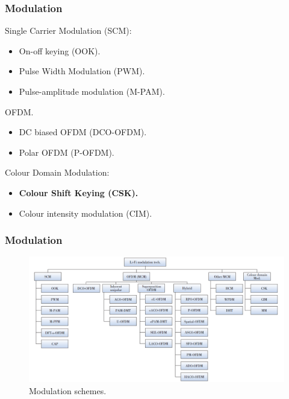 \documentclass[mathserif]{beamer}
\newcommand{\wait}{\vfill}
\begin{document}
\begin{frame}
\frametitle{Modulation}
Single Carrier Modulation (SCM):
\begin{itemize}
	\item On-off keying (OOK).
	\item Pulse Width Modulation (PWM).
	\item Pulse-amplitude modulation (M-PAM). \wait
\end{itemize}

OFDM.
\begin{itemize}
	\item DC biased OFDM (DCO-OFDM).
	\item Polar OFDM (P-OFDM). \wait
\end{itemize}

Colour Domain Modulation:
\begin{itemize}
	\item \textbf{Colour Shift Keying (CSK).}
	\item Colour intensity modulation (CIM). \wait
\end{itemize}	
\end{frame}	

\begin{frame}
\frametitle{Modulation}
\begin{figure}
\centering
\includegraphics[width=\linewidth]{figuras/modulation}
\caption{Modulation schemes.}
\label{fig:modulation}
\end{figure}
\end{frame}	

\end{document}
